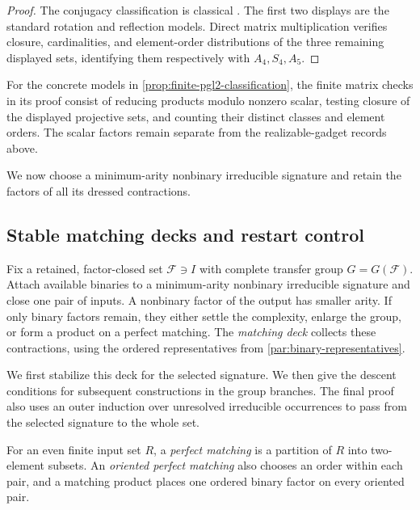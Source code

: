 \documentclass[11pt,letterpaper,onecolumn]{article}
\theoremstyle{plain}
\theoremstyle{definition}
\theoremstyle{remark}
\newcommand{\cF}{\mathcal F}
\begin{document}
\begin{proof}
The conjugacy classification is classical
\cite[Section~5.1]{Beardon1983}.  The first two displays are the standard
rotation and reflection models.  Direct matrix multiplication verifies
closure, cardinalities, and element-order distributions of the three
remaining displayed sets, identifying them respectively with
\(A_4,S_4,A_5\).
\end{proof}

For the concrete models in \cref{prop:finite-pgl2-classification}, the
finite matrix checks in its proof consist of reducing products modulo
nonzero scalar, testing closure of the displayed projective sets, and
counting their distinct classes and element orders.  The scalar factors
remain separate from the realizable-gadget records above.

We now choose a minimum-arity nonbinary irreducible signature and retain the factors
of all its dressed contractions.

\subsection{Stable matching decks and restart control}
\label{subsec:safe-matching-cards}

Fix a retained, factor-closed set \(\cF\ni I\) with complete transfer
group \(G=G(\cF)\). Attach available binaries to a minimum-arity
nonbinary irreducible signature and close one pair of inputs. A nonbinary
factor of the output has smaller arity. If only binary factors remain,
they either settle the complexity, enlarge the group, or form a product
on a perfect matching. The \emph{matching deck} collects these contractions,
using the ordered representatives from \cref{par:binary-representatives}.

We first stabilize this deck for the selected signature. We then give
the descent conditions for subsequent constructions in the group branches.
The final proof also uses an outer induction over unresolved irreducible
occurrences to pass from the selected signature to the whole set.

For an even finite input set \(R\), a \emph{perfect matching} is a partition
of \(R\) into two-element subsets.  An \emph{oriented perfect matching}
also chooses an order within each pair, and a matching product places one
ordered binary factor on every oriented pair.
\end{document}
